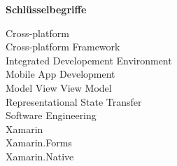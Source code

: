 %
%
% 
% 

\begin{center}
{\Large\bfseries Schlüsselbegriffe}
\end{center}

\noindent
Cross-platform\\
Cross-platform Framework\\
Integrated Developement Environment\\
Mobile App Development\\
Model View View Model\\
Representational State Transfer\\
Software Engineering\\
Xamarin\\
Xamarin.Forms\\
Xamarin.Native\\
